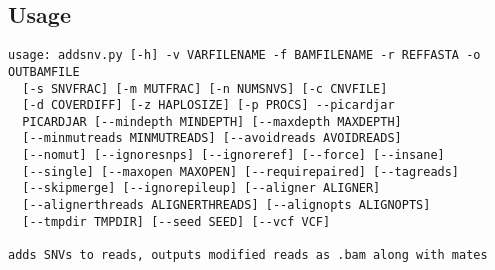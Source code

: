 \documentclass[letterpaper,11pt]{article}
\begin{document}
\subsection{Usage}
\begin{verbatim}
usage: addsnv.py [-h] -v VARFILENAME -f BAMFILENAME -r REFFASTA -o OUTBAMFILE
  [-s SNVFRAC] [-m MUTFRAC] [-n NUMSNVS] [-c CNVFILE]
  [-d COVERDIFF] [-z HAPLOSIZE] [-p PROCS] --picardjar
  PICARDJAR [--mindepth MINDEPTH] [--maxdepth MAXDEPTH]
  [--minmutreads MINMUTREADS] [--avoidreads AVOIDREADS]
  [--nomut] [--ignoresnps] [--ignoreref] [--force] [--insane]
  [--single] [--maxopen MAXOPEN] [--requirepaired] [--tagreads]
  [--skipmerge] [--ignorepileup] [--aligner ALIGNER]
  [--alignerthreads ALIGNERTHREADS] [--alignopts ALIGNOPTS]
  [--tmpdir TMPDIR] [--seed SEED] [--vcf VCF]

adds SNVs to reads, outputs modified reads as .bam along with mates


\end{verbatim}
\end{document}
